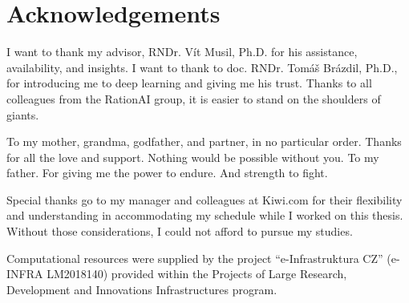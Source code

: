 \chapter*{Acknowledgements}

I want to thank my advisor, RNDr. Vít Musil, Ph.D. for his assistance, availability, and insights.
I want to thank to doc. RNDr. Tomáš Brázdil, Ph.D., for introducing me to deep learning and giving me his trust.
Thanks to all colleagues from the RationAI group, it is easier to stand on the shoulders of giants.

To my mother, grandma, godfather, and partner, in no particular order.
Thanks for all the love and support.
Nothing would be possible without you.
To my father.
For giving me the power to endure.
And strength to fight.

Special thanks go to my manager and colleagues at Kiwi.com for their flexibility and understanding in accommodating my schedule while I worked on this thesis.
Without those considerations, I could not afford to pursue my studies.

Computational resources were supplied by the project ``e-Infrastruktura CZ'' (e-INFRA LM2018140) provided within the Projects of Large Research, Development and Innovations Infrastructures program.

